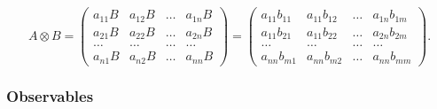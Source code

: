 \documentclass[pra,amsfonts,showpacs,showkeys,preprint]{revtex4}
\begin{document}
\begin{equation}
A\otimes B
=
\left(
\begin{array}{cccccccccc}
a_{11} B& a_{12} B& \ldots & a_{1n}B \\
a_{21} B& a_{22} B& \ldots & a_{2n}B \\
\ldots & \ldots & \ldots & \ldots \\
a_{n1} B& a_{n2} B& \ldots & a_{nn}B
\end{array}
\right)
=
\left(
\begin{array}{cccccccccc}
a_{11} b_{11}& a_{11} b_{12} & \ldots & a_{1n}b_{1m} \\
a_{11} b_{21}& a_{11} b_{22}& \ldots & a_{2n} b_{2m}\\
\ldots & \ldots & \ldots & \ldots \\
a_{nn} b_{m1}& a_{nn} b_{m2}& \ldots & a_{nn} b_{mm}
\end{array}
\right)
.
\end{equation}

\subsubsection*{Observables}
\end{document}
